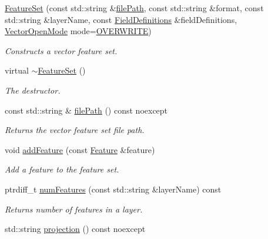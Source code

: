 \begin{DoxyCompactItemize}
\item 
\hyperlink{group___vector_module_ga22680002b22c9e68d0fbaeada82d6e23}{Feature\+Set} (const std\+::string \&\hyperlink{group___vector_module_ga438beae23c8c7333e1763addeb99b286}{file\+Path}, const std\+::string \&format, const std\+::string \&layer\+Name, const \hyperlink{namespacedg_1_1deepcore_1_1vector_a89a39c2fa657ff95f116cfed4a951386}{Field\+Definitions} \&field\+Definitions, \hyperlink{group___vector_module_ga1ee9d7536b27c1a7852203d093939d2b}{Vector\+Open\+Mode} mode=\hyperlink{group___vector_module_gga1ee9d7536b27c1a7852203d093939d2ba856418f517d622ab3225c83be2acad14}{O\+V\+E\+R\+W\+R\+I\+TE})
\begin{DoxyCompactList}\small\item\em Constructs a vector feature set. \end{DoxyCompactList}\item 
virtual \hyperlink{classdg_1_1deepcore_1_1vector_1_1_feature_set_acc3af359cff5a59c1ca421e8970c6118}{$\sim$\+Feature\+Set} ()
\begin{DoxyCompactList}\small\item\em The destructor. \end{DoxyCompactList}\item 
const std\+::string \& \hyperlink{group___vector_module_ga438beae23c8c7333e1763addeb99b286}{file\+Path} () const noexcept
\begin{DoxyCompactList}\small\item\em Returns the vector feature set file path. \end{DoxyCompactList}\item 
void \hyperlink{group___vector_module_ga9117c49056efd1ac51c2bb74043b50d6}{add\+Feature} (const \hyperlink{classdg_1_1deepcore_1_1vector_1_1_feature}{Feature} \&feature)
\begin{DoxyCompactList}\small\item\em Add a feature to the feature set. \end{DoxyCompactList}\item 
ptrdiff\+\_\+t \hyperlink{group___vector_module_ga6ea15b282c93cedd1ddc676f1146e967}{num\+Features} (const std\+::string \&layer\+Name) const 
\begin{DoxyCompactList}\small\item\em Returns number of features in a layer. \end{DoxyCompactList}\item 
std\+::string \hyperlink{group___vector_module_ga6067c0ad1fc35879804d30756d6af8d8}{projection} () const noexcept

\end{DoxyCompactItemize}
